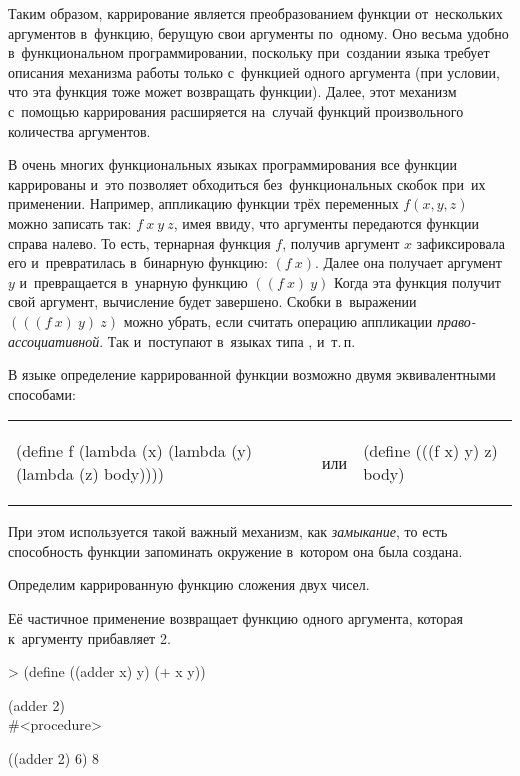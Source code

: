 Таким образом, каррирование является преобразованием функции от~нескольких аргументов в~функцию, берущую свои аргументы по~одному. Оно весьма удобно в~функциональном программировании, поскольку при~создании языка требует описания механизма работы только с~функцией одного аргумента (при условии, что эта функция тоже может возвращать функции). Далее, этот механизм с~помощью каррирования расширяется на~случай функций произвольного количества аргументов.

\label{ML-notation}В очень многих функциональных языках программирования все функции каррированы и~это позволяет обходиться без~функциональных скобок при~их применении. Например, аппликацию функции трёх переменных $f(x, y, z)$ можно записать так: $f~x~y~z$, имея ввиду, что аргументы передаются функции справа налево. То есть, тернарная функция $f$, получив аргумент $x$ зафиксировала его и~превратилась в~бинарную функцию: $(f\ x)$. Далее она получает аргумент $y$ и~превращается в~унарную функцию $((f\ x)\ y)$ Когда эта функция получит свой аргумент, вычисление будет завершено. Скобки в~выражении $(((f\ x)\ y)\ z)$ можно убрать, если считать операцию аппликации \emph{право-ассоциативной}. Так и~поступают в~языках типа ,  и~т.\,п.

В языке \Scheme определение каррированной функции возможно двумя эквивалентными способами:
\begin{center}
\begin{tabular}{lcl}
\begin{SchemeCode}
(define f
  (lambda (x)
    (lambda (y)
      (lambda (z) body))))
\end{SchemeCode} & или &
\begin{SchemeCode}
(define (((f x) y) z)
  body)
\end{SchemeCode}
\end{tabular}
\vspace{-2\bigskipamount}
\end{center}
При этом используется такой важный механизм, как \emph{замыкание}, то есть способность функции запоминать окружение в~котором она была создана.

\begin{example}{Определим каррированную функцию сложения двух чисел.

Её частичное применение возвращает функцию одного аргумента, которая к~аргументу прибавляет 2.}
\begin{mREPLin}
> (define ((adder x) y)
    (+ x y))
\end{mREPLin}

\REPL
  {(adder 2)}
  {\\\#<procedure>}

\REPL
  {((adder 2) 6)}
  {8}
\end{example}


